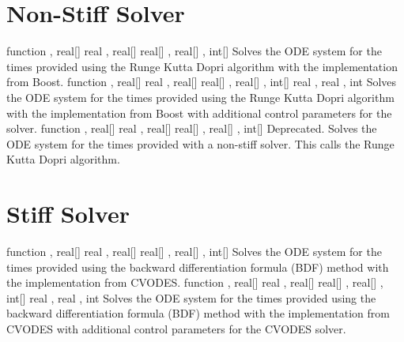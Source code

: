 \section{Non-Stiff Solver}

\begin{description}
                  {function , real[] }%
                  {real , real[] }%
                  {real[] , real[] , int[] }%
                  {Solves the ODE system for the times provided
                    using the Runge Kutta Dopri algorithm with the implementation
                    from Boost.}
                {function , real[] }%
                {real , real[] }%
                {real[] , real[] , int[] }%
                {real , real , int }%
                {Solves the ODE system for the times provided using the Runge Kutta
                  Dopri algorithm with the implementation from Boost with
                  additional control parameters for the solver.}
                 {function , real[] }%
                 {real , real[] }%
                 {real[] , real[] , int[] }%
                 {Deprecated. Solves the ODE system for the times provided with a
                   non-stiff solver.  This calls the Runge Kutta Dopri algorithm.}
\end{description}


\section{Stiff Solver}

\begin{description}
                  {function , real[] }%
                  {real , real[] }%
                  {real[] , real[] , int[] }%
                  {Solves the ODE system for the times provided using the backward
                    differentiation formula (BDF) method with the implementation from
                    CVODES.}
                {function , real[] }%
                {real , real[] }%
                {real[] , real[] , int[] }%
                {real , real , int }%
                {Solves the ODE system for the times provided using the backward
                  differentiation formula (BDF) method with the implementation from
                  CVODES with additional control parameters for the CVODES solver.}
\end{description}

